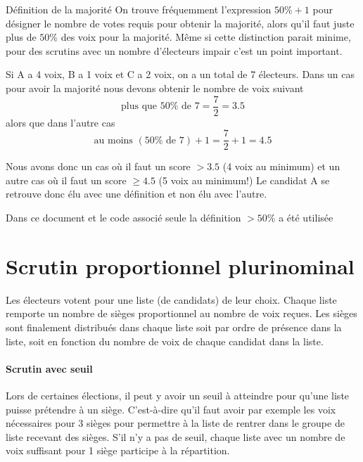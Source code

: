 \documentclass[../report]{subfiles}
\begin{document}
  \begin{important}[$50\% + 1$ versus $ > 50\%$]{Définition de la majorité}
    On trouve fréquemment l'expression $50\%+1$ pour désigner le nombre de votes requis pour
    obtenir la majorité, alors qu'il faut juste plus de $50\%$ des voix pour la majorité.
    Même si cette distinction parait minime, pour des scrutins avec un nombre d'électeurs 
    impair c'est un point important.

    Si A a 4 voix, B a 1 voix et C a 2 voix, on a un total de 7 électeurs.
    Dans un cas pour avoir la majorité nous devons obtenir le nombre de voix suivant
    \[ \text{plus que }50\%\text{ de }7 = \frac{7}{2} = 3.5 \]
    alors que dans l'autre cas
    \[ \text{au moins }(50\%\text{ de }7) + 1 = \frac{7}{2} + 1 = 4.5 \]

    Nous avons donc un cas où il faut un score $ > 3.5 $ (4 voix au minimum) et un autre cas où il faut un score 
    $ \geqslant 4.5 $ (5 voix au minimum!)
    Le candidat A se retrouve donc élu avec une définition et non élu avec l'autre.

    Dans ce document et le code associé seule la définition $> 50\%$ a été utilisée
  \end{important}

  \section{Scrutin proportionnel plurinominal}

  Les électeurs votent pour une liste (de candidats) de leur choix.
  Chaque liste remporte un nombre de sièges proportionnel au nombre de voix reçues.
  Les sièges sont finalement distribués dans chaque liste soit par ordre de présence dans
  la liste, soit en fonction du nombre de voix de chaque candidat dans la liste.

  \paragraph{Scrutin avec seuil}

  Lors de certaines élections, il peut y avoir un seuil à atteindre pour qu'une liste puisse 
  prétendre à un siège.
  C'est-à-dire qu'il faut avoir par exemple les voix nécessaires pour 3 sièges pour permettre
  à la liste de rentrer dans le groupe de liste recevant des sièges.
  S'il n'y a pas de seuil, chaque liste avec un nombre de voix suffisant pour 1 siège participe 
  à la répartition.
  
\end{document}
